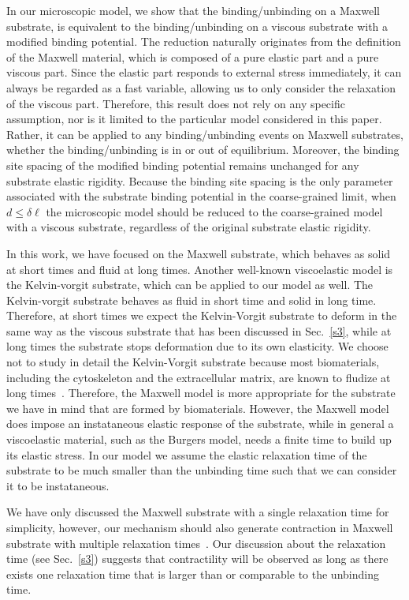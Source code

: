\documentclass[twocolumn,prl,english]{revtex4-1}
\begin{document}
In our microscopic model, we show that the binding/unbinding on a Maxwell substrate, is equivalent to the binding/unbinding on a viscous substrate with a modified binding potential. The reduction naturally originates from the definition of the Maxwell material, which is composed of a pure elastic  part and a pure viscous part. Since the elastic part responds to external stress immediately, it can always be regarded as a fast variable, allowing us to only consider the relaxation of the viscous part. Therefore, this result  does not rely on any specific assumption, nor is it limited to the particular model considered in this paper. Rather, it can be applied to any binding/unbinding events on Maxwell substrates, whether the binding/unbinding is in or out of equilibrium. Moreover, the binding site spacing of the modified binding potential remains unchanged for any substrate elastic rigidity. Because the binding site spacing is the only parameter associated with the substrate binding potential in the coarse-grained limit,  when $d\leq \delta \ell$ the microscopic model should be reduced to the  coarse-grained model with a viscous substrate, regardless of the original substrate elastic rigidity. 

In this work, we have focused on the Maxwell substrate, which behaves as solid at short times and fluid at long times.  Another well-known viscoelastic model is the Kelvin-vorgit substrate, which can be applied to our model as well. The Kelvin-vorgit substrate behaves as fluid in short time and solid in long time. Therefore, at short times we expect the Kelvin-Vorgit substrate to deform in the same way as the viscous substrate that has been discussed in Sec.~\ref{s3}, while at long times the substrate stops deformation due to its own elasticity. We choose not to study in detail the  Kelvin-Vorgit substrate because most biomaterials, including the cytoskeleton and the extracellular matrix, are known to fludize at long times~\cite{Broedersz2010, Ijima2018}. Therefore, the Maxwell model is more appropriate for the substrate we have in mind that are formed by  biomaterials. However, the Maxwell model does impose an instataneous elastic response of the substrate, while in general a viscoelastic material, such as the Burgers model, needs a finite time to build up its elastic stress. In our model we assume the elastic relaxation time of the substrate to be much smaller than the unbinding time such that we can consider it to be instataneous. 

We have only discussed the Maxwell substrate with a single relaxation time for simplicity, however, our mechanism should also generate contraction in Maxwell substrate with multiple relaxation times~\cite{wiechert1889,Broedersz2010, Chen2021}. Our discussion about the relaxation time (see Sec.~\ref{s3}) suggests that contractility will be observed as long as there exists one relaxation time that is larger than or comparable  to the unbinding time. 
\end{document}
